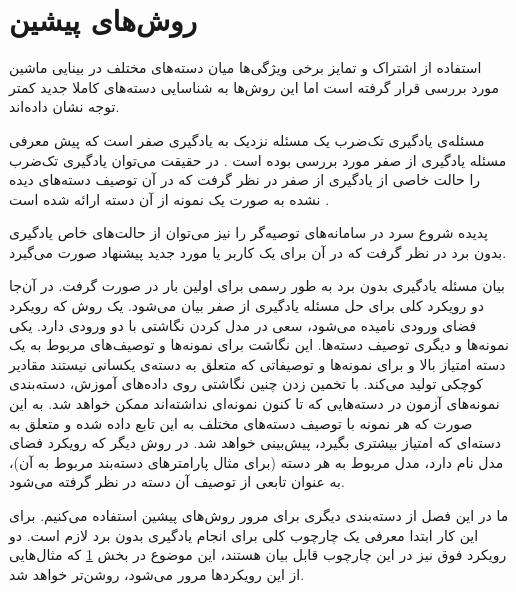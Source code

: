 \chapter{روش‌های پیشین}

استفاده از اشتراک و تمایز برخی ویژگی‌ها میان دسته‌های مختلف در بینایی ماشین مورد بررسی قرار گرفته است
\cite{BakkerH03, TsochantaridisJHA05, ulman2005}
اما این روش‌ها به شناسایی دسته‌های کاملا جدید کمتر توجه نشان داده‌اند.

مسئله‌ی یادگیری تک‌ضرب
یک مسئله نزدیک به یادگیری صفر است که پیش معرفی مسئله یادگیری از صفر مورد بررسی بوده است
\cite{miller12}.
در حقیقت می‌توان یادگیری تک‌ضرب را حالت خاصی از یادگیری از صفر در نظر گرفت که در آن توصیف دسته‌های دیده نشده به صورت یک نمونه از آن دسته ارائه شده است
\cite{bengio08}.

 پدیده شروع سرد
 در سامانه‌های توصیه‌گر
 را نیز می‌توان از حالت‌های خاص یادگیری بدون برد در نظر گرفت که در آن برای یک کاربر یا مورد جدید پیشنهاد صورت می‌گیرد.


بیان مسئله  یادگیری بدون برد به طور رسمی برای اولین بار در
\cite{bengio08}
صورت گرفت. در آن‌جا دو رویکرد کلی برای حل مسئله یادگیری از صفر بیان می‌شود. یک روش که رویکرد فضای ورودی
نامیده می‌شود، سعی در مدل کردن نگاشتی با دو ورودی دارد. یکی نمونه‌ها و دیگری توصیف دسته‌ها. این نگاشت برای نمونه‌ها و توصیف‌های مربوط به یک دسته امتیاز بالا و برای نمونه‌ها و توصیفاتی که متعلق به دسته‌ی یکسانی نیستند مقادیر کوچکی تولید می‌کند. با تخمین زدن چنین نگاشتی روی داده‌های آموزش، دسته‌بندی نمونه‌های آزمون در دسته‌هایی که تا کنون نمونه‌ای نداشته‌اند ممکن خواهد شد. به این صورت که هر نمونه با توصیف دسته‌های مختلف به این تابع داده شده و متعلق به دسته‌ای که امتیاز بیشتری بگیرد، پیش‌بینی خواهد شد.
در روش دیگر که رویکرد فضای مدل
نام دارد، مدل مربوط به هر دسته (برای مثال پارامترهای دسته‌بند مربوط به آن)، به عنوان تابعی از توصیف آن دسته در نظر گرفته می‌شود.

ما در این فصل از دسته‌بندی دیگری برای مرور روش‌های پیشین استفاده می‌کنیم. برای این کار ابتدا معرفی یک چارچوب کلی برای انجام یادگیری بدون برد لازم است. دو رویکرد فوق نیز در این چارچوب قابل بیان هستند، این موضوع در بخش \ref{} که مثال‌هایی از این رویکردها مرور می‌شود، روشن‌تر خواهد شد.

